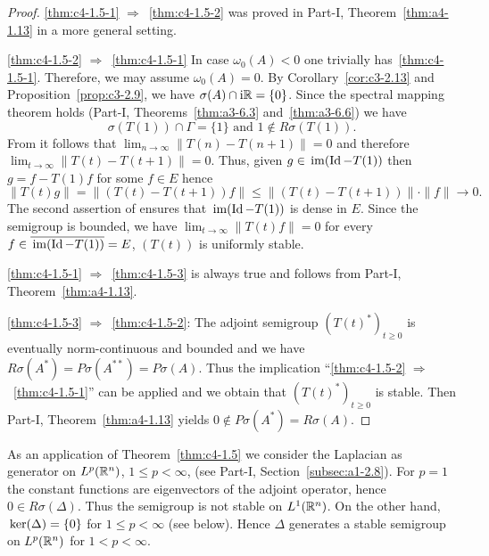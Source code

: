 \begin{proof}
\ref{thm:c4-1.5-1} $\Rightarrow$~\ref{thm:c4-1.5-2} was proved in Part-I, Theorem~\ref{thm:a4-1.13} in a more general setting.

\ref{thm:c4-1.5-2} $\Rightarrow$~\ref{thm:c4-1.5-1} In case $\omega_{0}(A) < 0$ one trivially has~\ref{thm:c4-1.5-1}.
Therefore, we may assume $\omega_{0}(A) = 0$.
By Corollary~\ref{cor:c3-2.13} and Proposition~\ref{prop:c3-2.9},  we have $\sigma(A) \cap \mathrm{i}\mathbb{R} = \{0\}$.
Since the spectral mapping theorem holds 
(\cf Part-I, Theorems~\ref{thm:a3-6.3} and~\ref{thm:a3-6.6}) we have
\begin{equation}\label{eq:c4-1.5}
\sigma(T(1)) \cap \Gamma = \{1\} \text{ and } 1 \notin R{\sigma}(T(1)).
\end{equation}
From  it follows that $\lim_{n \to \infty} \|T(n) - T(n+1)\| = 0$ and therefore $\lim_{t \to \infty} \|T(t) - T(t+1)\| = 0$.
Thus, given $g \in \mathop{}\mathrm{im}(\operatorname{Id} - T(1))$ then $g = f - T(1)f$ for some $f \in E$ hence 
\[
\|T(t)g\| = \|(T(t) - T(t+1))f\| \leq \|(T(t) - T(t+1))\| \cdot \|f\| \to 0.
\]
The second assertion of  ensures that $\mathop{}\mathrm{im}(\operatorname{Id} - T(1))$ is dense in $E$.
Since the semigroup is bounded, we have $\lim_{t \to \infty} \|T(t)f\| = 0$ for every $f \in \overline{\mathop{}\mathrm{im}(\operatorname{Id} - T(1))} = E$, \ie  $(T(t))$ is uniformly stable.

\ref{thm:c4-1.5-1} $\Rightarrow$~\ref{thm:c4-1.5-3} is always true and follows from Part-I, Theorem~\ref{thm:a4-1.13}.

\ref{thm:c4-1.5-3} $\Rightarrow$~\ref{thm:c4-1.5-2}:  
The adjoint semigroup $(T(t)^*)_{t \geq 0}$ is eventually norm-continuous and boun\-ded and we have $R{\sigma}(A^*) = P{\sigma}(A^{**}) = P{\sigma}(A)$.
Thus the implication \enquote{\ref{thm:c4-1.5-2} $\Rightarrow$~\ref{thm:c4-1.5-1}} can be applied and we obtain that $(T(t)^*)_{t \geq 0}$ is stable.
Then Part-I, Theorem~\ref{thm:a4-1.13} yields $0 \notin P{\sigma}(A^*) = R{\sigma}(A)$.
\end{proof}
As an application of Theorem~\ref{thm:c4-1.5}  we consider the Laplacian as generator on $L^{p}(\mathbb{R}^{n})$, $1 \leq p < \infty$, (see Part-I, Section~\ref{subsec:a1-2.8}).
For $p = 1$ the constant functions are eigenvectors of the adjoint operator, hence $0 \in R{\sigma}(\Delta)$.
Thus the semigroup is not stable on $L^{1}(\mathbb{R}^{n})$.
On the other hand, $\mathop{}\mathrm{ker}(\Delta) =\{ 0 \}$ for $ 1 \leq p < \infty$ (see below). 
Hence $\Delta$ generates a stable semigroup on $L^{p}(\mathbb{R}^{n})$ for $1 < p < \infty$.

